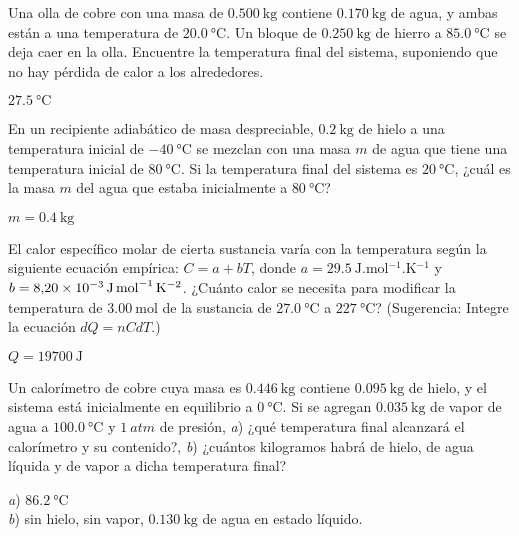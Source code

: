 %
\begin{Exercise}
  {}{}
  Una olla de cobre con una masa de $\SI{0.500}{\kilogram}$ contiene $\SI{0.170}{\kilogram}$ de agua, y ambas están a una temperatura de $\SI{20.0}{\celsius}$. Un bloque de $\SI{0.250}{\kilogram}$ de hierro a $\SI{85.0}{\celsius}$ se deja caer en la olla. Encuentre la temperatura final del sistema, suponiendo que no hay pérdida de calor a los alrededores.
\end{Exercise}
\begin{Answer}
  $\SI{27.5}{\celsius}$
\end{Answer}
%
\begin{Exercise}
  En un recipiente adiabático de masa despreciable, $\SI{0.2}{\kilogram}$ de hielo a una temperatura inicial de $\SI{-40}{\celsius}$ se mezclan con una masa $m$ de agua que tiene una temperatura inicial de $\SI{80}{\celsius}$. Si la temperatura final del sistema es $\SI{20}{\celsius}$, ¿cuál es la masa $m$ del agua que estaba inicialmente a $\SI{80}{\celsius}$?
\end{Exercise}
\begin{Answer}
  $m=\SI{0.4}{\kilogram}$
\end{Answer}
%
\begin{Exercise}
  El calor específico molar de cierta sustancia varía con la temperatura según la siguiente ecuación empírica: $C = a + bT$, donde $a=\SI{29.5}{\joule.\mole^{-1}.\kelvin^{-1}}$ y $b=\SI{8.20E-3}{\joule.\mole^{-1}.\kelvin^{-2}}$. ¿Cuánto calor se necesita para modificar la temperatura de $\SI{3.00}{\mole}$ de la sustancia de $\SI{27.0}{\celsius}$ a $\SI{227}{\celsius}$? (Sugerencia: Integre la ecuación $dQ = nCdT$.)
\end{Exercise}
\begin{Answer}
  $Q=\SI{19700}{\joule}$
\end{Answer}
%
\begin{Exercise}
  Un calorímetro de cobre cuya masa es $\SI{0.446}{\kilogram}$ contiene $\SI{0.095}{\kilogram}$ de hielo, y el sistema está inicialmente en equilibrio a $\SI{0}{\celsius}$. Si se agregan $\SI{0.035}{\kilogram}$ de vapor de agua a $\SI{100.0}{\celsius}$ y $\SI{1}{atm}$ de presión, \textit{a}) ¿qué temperatura final alcanzará el calorímetro y su contenido?, \textit{b}) ¿cuántos kilogramos habrá de hielo, de agua líquida y de vapor a dicha temperatura final?
\end{Exercise}
\begin{Answer}
	\begin{minipage}[t]{.4\textwidth}
    \textit{a}) $\SI{86.2}{\celsius}$\\ \textit{b}) sin hielo, sin vapor, $\SI{0.130}{\kilogram}$ de agua en estado líquido.
  \end{minipage}
\end{Answer}
